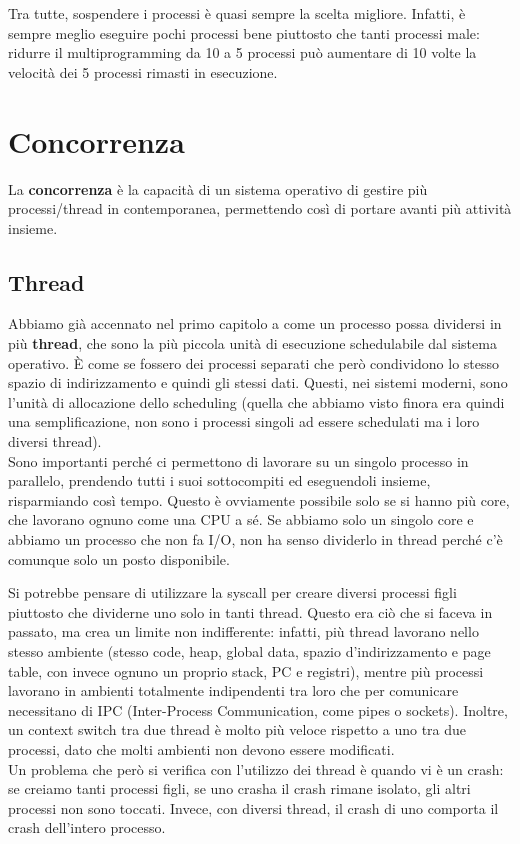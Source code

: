 \documentclass[11pt, a4paper, titlepage, oneside]{scrbook}
\begin{document}
Tra tutte, sospendere i processi è quasi sempre la scelta migliore. Infatti, è sempre meglio eseguire pochi processi bene piuttosto che tanti processi male: ridurre il multiprogramming da 10 a 5 processi può aumentare di 10 volte la velocità dei 5 processi rimasti in esecuzione.

\chapter{Concorrenza}

\begin{Definizione}[Concorrenza]
\label{def-concorrenza}
La \textbf{concorrenza} è la capacità di un sistema operativo di gestire più processi/thread in contemporanea, permettendo così di portare avanti più attività insieme.
\end{Definizione}

\section{Thread}

Abbiamo già accennato nel primo capitolo a come un processo possa dividersi in più \textbf{thread}, che sono la più piccola unità di esecuzione schedulabile dal sistema operativo. È come se fossero dei processi separati che però condividono lo stesso spazio di indirizzamento e quindi gli stessi dati. Questi, nei sistemi moderni, sono l'unità di allocazione dello scheduling (quella che abbiamo visto finora era quindi una semplificazione, non sono i processi singoli ad essere schedulati ma i loro diversi thread). \\
Sono importanti perché ci permettono di lavorare su un singolo processo in parallelo, prendendo tutti i suoi sottocompiti ed eseguendoli insieme, risparmiando così tempo. Questo è ovviamente possibile solo se si hanno più core, che lavorano ognuno come una CPU a sé. Se abbiamo solo un singolo core e abbiamo un processo che non fa I/O, non ha senso dividerlo in thread perché c'è comunque solo un posto disponibile. 

Si potrebbe pensare di utilizzare la syscall  per creare diversi processi figli piuttosto che dividerne uno solo in tanti thread. Questo era ciò che si faceva in passato, ma crea un limite non indifferente: infatti, più thread lavorano nello stesso ambiente (stesso code, heap, global data, spazio d'indirizzamento e page table, con invece ognuno un proprio stack, PC e registri), mentre più processi lavorano in ambienti totalmente indipendenti tra loro che per comunicare necessitano di IPC (Inter-Process Communication, come pipes o sockets). Inoltre, un context switch tra due thread è molto più veloce rispetto a uno tra due processi, dato che molti ambienti non devono essere modificati. \\
Un problema che però si verifica con l'utilizzo dei thread è quando vi è un crash: se creiamo tanti processi figli, se uno crasha il crash rimane isolato, gli altri processi non sono toccati. Invece, con diversi thread, il crash di uno comporta il crash dell'intero processo.
\end{document}
